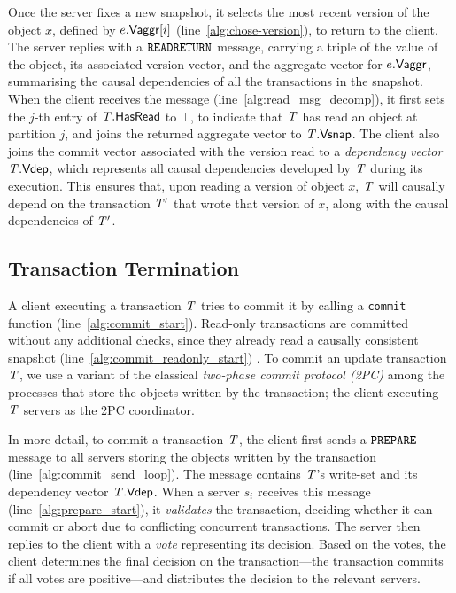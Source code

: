 Once the server fixes a new snapshot, it selects the most recent version of the object $x$, defined by $e.\mathsf{Vaggr}[i]$ (line~\ref{alg:chose-version}), to return to the client. The server replies with a ${\tt READRETURN}$ message, carrying a triple of the value of the object, its associated version vector, and the aggregate vector for $e.\mathsf{Vaggr}$, summarising the causal dependencies of all the transactions in the snapshot. When the client receives the message (line~\ref{alg:read_msg_decomp}), it first sets the $j$-th entry of $\mathit{T}.\mathsf{HasRead}$ to $\top$, to indicate that $\mathit{T}$ has read an object at partition $j$, and joins the returned aggregate vector to $\mathit{T}.\mathsf{Vsnap}$. The client also joins the commit vector associated with the version read to a \emph{dependency vector} $\mathit{T}.\mathsf{Vdep}$, which represents all causal dependencies developed by $\mathit{T}$ during its execution. This ensures that, upon reading a version of object $x$, $\mathit{T}$ will causally depend on the transaction $\mathit{T}'$ that wrote that version of $x$, along with the causal dependencies of $\mathit{T}'$.

\subsection{Transaction Termination}

A client executing a transaction $\mathit{T}$ tries to commit it by calling a {\tt commit} function (line~\ref{alg:commit_start}). Read-only transactions are committed without any additional checks, since they already read a causally consistent snapshot (line~\ref{alg:commit_readonly_start}) . To commit an update transaction $\mathit{T}$, we use a variant of the classical \emph{two-phase commit protocol (2PC)}  among the processes that store the objects written by the transaction; the client executing $\mathit{T}$ servers as the 2PC coordinator.

In more detail, to commit a transaction $\mathit{T}$, the client first sends a ${\tt PREPARE}$ message to all servers storing the objects written by the transaction (line~\ref{alg:commit_send_loop}). The message contains $\mathit{T}$'s write-set and its dependency vector $\mathit{T}.\mathsf{Vdep}$. When a server $s_i$ receives this message (line~\ref{alg:prepare_start}), it \emph{validates} the transaction, deciding whether it can commit or abort due to conflicting concurrent transactions. The server then replies to the client with a \emph{vote} representing its decision. Based on the votes, the client determines the final decision on the transaction---the transaction commits if all votes are positive---and distributes the decision to the relevant servers.

